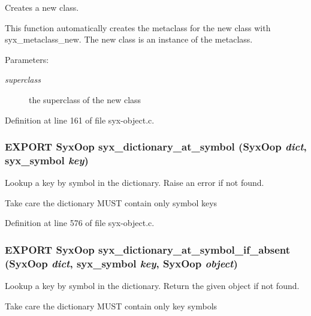 Creates a new class.

This function automatically creates the metaclass for the new class with syx\_\-metaclass\_\-new. The new class is an instance of the metaclass.

\begin{Desc}
\item[Parameters:]
\begin{description}
\item[{\em superclass}]the superclass of the new class \end{description}
\end{Desc}


Definition at line 161 of file syx-object.c.\hypertarget{syx-object_8h_b4f98861384da9ef7ae4017b0639e2ab}{
\subsubsection{\setlength{\rightskip}{0pt plus 5cm}EXPORT {\bf SyxOop} syx\_\-dictionary\_\-at\_\-symbol ({\bf SyxOop} {\em dict}, \/  {\bf syx\_\-symbol} {\em key})}}
\label{syx-object_8h_b4f98861384da9ef7ae4017b0639e2ab}


Lookup a key by symbol in the dictionary. Raise an error if not found.

Take care the dictionary MUST contain only symbol keys 

Definition at line 576 of file syx-object.c.\hypertarget{syx-object_8h_6a48a39293c1dd5141d431f1ee8a8f7a}{
\subsubsection{\setlength{\rightskip}{0pt plus 5cm}EXPORT {\bf SyxOop} syx\_\-dictionary\_\-at\_\-symbol\_\-if\_\-absent ({\bf SyxOop} {\em dict}, \/  {\bf syx\_\-symbol} {\em key}, \/  {\bf SyxOop} {\em object})}}
\label{syx-object_8h_6a48a39293c1dd5141d431f1ee8a8f7a}


Lookup a key by symbol in the dictionary. Return the given object if not found.

Take care the dictionary MUST contain only key symbols 

